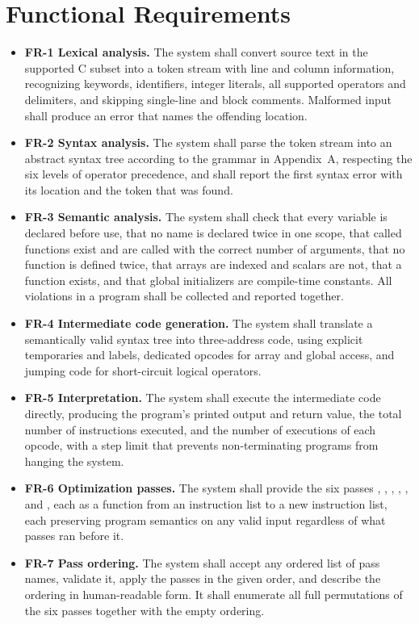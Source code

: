 \section{Functional Requirements}

\begin{itemize}
  \item \textbf{FR-1 Lexical analysis.} The system shall convert source text in the supported C subset into a token stream with line and column information, recognizing keywords, identifiers, integer literals, all supported operators and delimiters, and skipping single-line and block comments. Malformed input shall produce an error that names the offending location.
  \item \textbf{FR-2 Syntax analysis.} The system shall parse the token stream into an abstract syntax tree according to the grammar in Appendix~A, respecting the six levels of operator precedence, and shall report the first syntax error with its location and the token that was found.
  \item \textbf{FR-3 Semantic analysis.} The system shall check that every variable is declared before use, that no name is declared twice in one scope, that called functions exist and are called with the correct number of arguments, that no function is defined twice, that arrays are indexed and scalars are not, that a  function exists, and that global initializers are compile-time constants. All violations in a program shall be collected and reported together.
  \item \textbf{FR-4 Intermediate code generation.} The system shall translate a semantically valid syntax tree into three-address code, using explicit temporaries and labels, dedicated opcodes for array and global access, and jumping code for short-circuit logical operators.
  \item \textbf{FR-5 Interpretation.} The system shall execute the intermediate code directly, producing the program's printed output and return value, the total number of instructions executed, and the number of executions of each opcode, with a step limit that prevents non-terminating programs from hanging the system.
  \item \textbf{FR-6 Optimization passes.} The system shall provide the six passes , , , , , and , each as a function from an instruction list to a new instruction list, each preserving program semantics on any valid input regardless of what passes ran before it.
  \item \textbf{FR-7 Pass ordering.} The system shall accept any ordered list of pass names, validate it, apply the passes in the given order, and describe the ordering in human-readable form. It shall enumerate all full permutations of the six passes together with the empty ordering.

\end{itemize}
